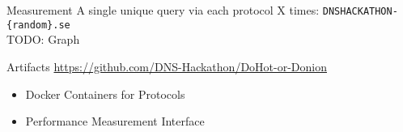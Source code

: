 \documentclass[xcolor=x11names,dvipsnames,aspectratio=169]{beamer}
\begin{document}
    \begin{frame}{Measurement}
        A single unique query via each protocol X times:
        \texttt{DNSHACKATHON-\{random\}.se}\\
        \vspace{2em}
        TODO: Graph
    \end{frame}

    \begin{frame}{Artifacts}
        \url{https://github.com/DNS-Hackathon/DoHot-or-Donion}
        \begin{itemize}
            \item Docker Containers for Protocols
            \item Performance Measurement Interface
        \end{itemize}
    \end{frame}
\end{document}
